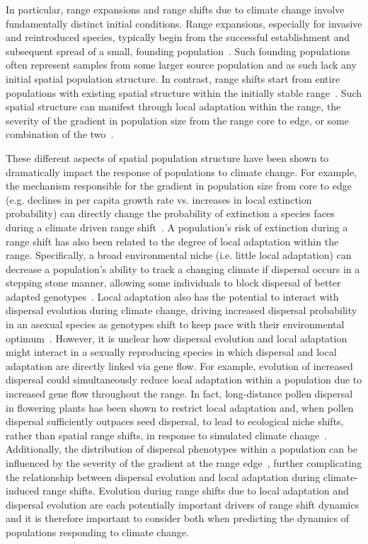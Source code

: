 \documentclass[12pt, oneside]{article}
\begin{document}
In particular, range expansions and range shifts due to climate change involve fundamentally distinct initial conditions. Range expansions, especially for invasive and reintroduced species, typically begin from the successful establishment and subsequent spread of a small, founding population~\citep{hastings2005spatial}. Such founding populations often represent samples from some larger source population and as such lack any initial spatial population structure. In contrast, range shifts start from entire populations with existing spatial structure within the initially stable range~\citep{hargreaves2014evolution}. Such spatial structure can manifest through local adaptation within the range, the severity of the gradient in population size from the range core to edge, or some combination of the two~\citep{hargreaves2014evolution, hargreaves2015fitness, henry2013eco}. 

These different aspects of spatial population structure have been shown to dramatically impact the response of populations to climate change. For example, the mechanism responsible for the gradient in population size from core to edge (e.g. declines in per capita growth rate vs. increases in local extinction probability) can directly change the probability of extinction a species faces during a climate driven range shift~\citep{henry2013eco}. A population's risk of extinction during a range shift has also been related to the degree of local adaptation within the range. Specifically, a broad environmental niche (i.e. little local adaptation) can decrease a population's ability to track a changing climate if dispersal occurs in a stepping stone manner, allowing some individuals to block dispersal of better adapted genotypes~\citep{atkins2010local}. Local adaptation also has the potential to interact with dispersal evolution during climate change, driving increased dispersal probability in an asexual species as genotypes shift to keep pace with their environmental optimum~\citep{hargreaves2015fitness}. However, it is unclear how dispersal evolution and local adaptation might interact in a sexually reproducing species in which dispersal and local adaptation are directly linked via gene flow. For example, evolution of increased dispersal could simultaneously reduce local adaptation within a population due to increased gene flow throughout the range. In fact, long-distance pollen dispersal in flowering plants has been shown to restrict local adaptation and, when pollen dispersal sufficiently outpaces seed dispersal, to lead to ecological niche shifts, rather than spatial range shifts, in response to simulated climate change~\citep{aguilee2016pollen}. Additionally, the distribution of dispersal phenotypes within a population can be influenced by the severity of the gradient at the range edge~\citep{henry2013eco, hargreaves2014evolution}, further complicating the relationship between dispersal evolution and local adaptation during climate-induced range shifts. Evolution during range shifts due to local adaptation and dispersal evolution are each potentially important drivers of range shift dynamics and it is therefore important to consider both when predicting the dynamics of populations responding to climate change.
\end{document}

